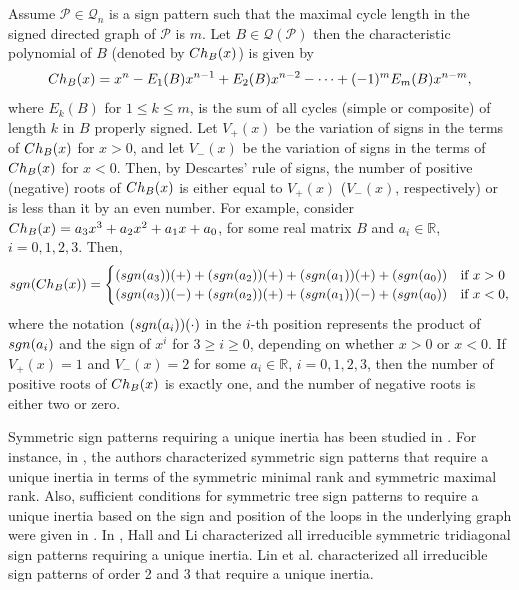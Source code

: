\documentclass[10pt,a4paper]{amsart}
\numberwithin{equation}{section}
\def\sgn{{\rm sgn}}
\def\Ch{{\rm Ch}}
\begin{document}
	
	
	Assume $\mathcal{P}\in \mathcal{Q}_n$ is a sign pattern such that the maximal cycle length in the signed directed graph of $\mathcal{P}$ is $m$. Let $B\in \mathcal{Q}(\mathcal{P})$ then the characteristic polynomial of $B$ (denoted by $\Ch_B(x)$) is given by $$\Ch_B(x)=x^n-E_1(B)x^{n-1}+E_2(B)x^{n-2}-\cdots+(-1)^mE_m(B)x^{n-m},$$ where $E_k(B)$ for $1\leq k\leq m$, is the sum of all cycles (simple or composite) of length $k$ in $B$ properly signed.
	Let $V_+(x)$ be the variation of signs in the terms of $\Ch_B(x)$ for $x>0$, and let $V_-(x)$ be the variation of signs in the terms of $\Ch_B(x)$ for $x<0$. Then, by Descartes' rule of signs, the number of positive (negative) roots of $\Ch_B(x)$ is either equal to $V_+(x)$ ($V_-(x)$, respectively) or is less than it by an even number. For example, consider $\Ch_B(x)=a_3x^3+a_2x^2+a_1x+a_0$, for some real matrix $B$ and $a_i\in \mathbb{R}$, $i=0,1,2,3$. Then, 
	$$
	\sgn(\Ch_B(x)) = \begin{cases} 
		(\sgn(a_3))(+)+(\sgn(a_2))(+)+(\sgn(a_1))(+)+(\sgn(a_0)) & \text{if} ~ x> 0 \\
		(\sgn(a_3))(-)+(\sgn(a_2))(+)+(\sgn(a_1))(-)+(\sgn(a_0)) & \text{if} ~x<0,
	\end{cases}
	$$ where the notation $(\sgn(a_i))(\cdot)$ in the $i$-th position represents the product of $\sgn(a_i)$ and the sign of $x^i$ for $3\geq i\geq 0$, depending on whether $x>0$ or $x<0$.
	If \( V_+(x) = 1 \) and \( V_-(x) = 2 \) for some \( a_i \in \mathbb{R} \), \( i = 0, 1, 2, 3 \), then the number of positive roots of $\Ch_B(x)$ is exactly one, and the number of negative roots is either two or zero.
	
	
	Symmetric sign patterns requiring a unique inertia has been studied in \cite{2001, 2001a, 2018, 2024}. For instance, in \cite{2001}, the authors characterized symmetric sign patterns that require a unique inertia in terms of the symmetric minimal rank and symmetric maximal rank. Also, sufficient conditions for symmetric tree sign patterns to require a unique inertia based on the sign and position of the loops in the underlying graph were given in \cite{2018, 2024}. In \cite{2001a}, Hall and Li characterized all irreducible symmetric tridiagonal sign patterns requiring a unique inertia. Lin et al. \cite{2018} characterized all irreducible sign patterns of order 2 and 3 that require a unique inertia.
	
\end{document}
